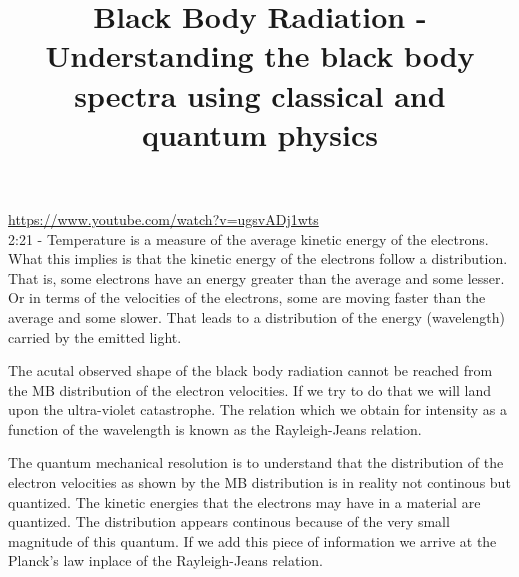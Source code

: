 \documentclass{../template/texnote}
\title{Black Body Radiation - Understanding
the black body spectra using classical and
quantum physics}
\begin{document}
    \maketitle {}

\url{https://www.youtube.com/watch?v=ugsvADj1wts}
\\

2:21 - Temperature is a measure of the average kinetic energy of the electrons.
What this implies is that the kinetic energy of the electrons follow a distribution. That is, some electrons have an energy greater than the average and some lesser.
Or in terms of the velocities of the electrons, some are moving faster than the average and some slower.
That leads to a distribution of the energy (wavelength) carried by the emitted light.

The acutal observed shape of the black body radiation cannot be reached from the MB distribution of the electron velocities.
If we try to do that we will land upon the ultra-violet catastrophe.
The relation which we obtain for intensity as a function of the wavelength is known as the Rayleigh-Jeans relation.

The quantum mechanical resolution is to understand that the distribution of the electron velocities as shown by the MB distribution is in reality not continous but quantized.
The kinetic energies that the electrons may have in a material are quantized.
The distribution appears continous because of the very small magnitude of this quantum.
If we add this piece of information we arrive at the Planck's law inplace of the Rayleigh-Jeans relation.

    \printbibliography
\end{document}
